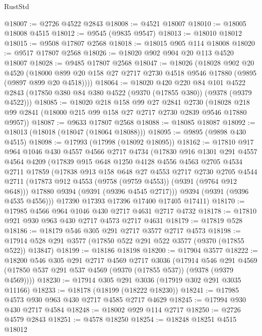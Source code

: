 \begin{lexlean}{RustStd}
\begin{coremodule}
@18007 := @2726 @4522 @2843
@18008 := @4521 @18007
@18010 := @18005 @18008 @4515
@18012 := @9545 (@9835 @9547)
@18013 := @18010 @18012
@18015 := @9508 @17807 @2568
@18018 := @18015 @905 @114 @18008
@18020 := @9517 @17807 @2568
@18026 := @18020 @902 @904 @20 @113 @4520 @18007
@18028 := @9485 @17807 @2568
@18047 := @18026
    (@18028
      @902
      @20
      @4520
      (@18000 @899 @20 @158 @27 @2717 @2730 @4518 @9546 @17880 (@9895 (@9897 @899 @20 @4518))))
@18064 := @18020
    @420
    @220
    @84
    @101
    @4522
    @2843
    (@17850 @380 @84 @380 @4522 (@9370 (@17855 @380)) (@9378 (@9379 @4522)))
@18085 := @18020
    @218
    @158
    @99
    @27
    @2841
    @2730
    (@18028 @218 @99 @2841 (@18000 @215 @99 @158 @27 @2717 @2730 @2839 @9546 @17880 @9957))
@18087 := @9633 @17807 @2568
@18088 := @18085 @18087
@18092 := @18013 (@18018 (@18047 (@18064 @18088)))
@18095 := @9895 (@9898 @430 @4515)
@18098 := @17993 (@17998 (@18092 @18095))
@18162 := @17810
    @917
    @964
    @1046
    @430
    @4557
    @4566
    @2717
    @4734
    (@17830
      @916
      @1301
      @291
      @4557
      @4564
      @4209
      (@17839
        @915
        @648
        @1250
        @4128
        @4556
        @4563
        @2705
        @4534
        @2711
        @17859
        (@17838
          @913
          @158
          @648
          @27
          @4553
          @2717
          @2730
          @2705
          @4544
          @2711
          (@17873 @912 @4553 (@9758 (@9759 @4553)) (@9391 (@9764 @912 @648)))
          @17880
          @9394
          (@9391 (@9396 @4545 @2717)))
        @9394
        (@9391 (@9396 @4535 @4556)))
      @17390
      @17393
      @17396
      @17400
      @17405
      @17411)
@18170 := @17985 @4566 @964 @1046 @430 @2717 @4631 @2717 @4732
@18178 := @17810 @921 @930 @963 @430 @2717 @4573 @2717 @4631
@18179 := @17819 @528
@18186 := @18179 @546 @305 @291 @2717 @3577 @2717 @4573
@18198 := @17914 @528 @291 @3577 (@17850 @522 @291 @522 @3577 (@9370 (@17855 @522)) @13847)
@18199 := @18186 @18198
@18200 := @17904 @3577
@18222 := @18200
    @546
    @305
    @291
    @2717
    @4569
    @2717
    @3036
    (@17914
      @546
      @291
      @4569
      (@17850 @537 @291 @537 @4569 (@9370 (@17855 @537)) (@9378 (@9379 @4569))))
@18230 := @17914 @305 @291 @3036 (@17919 @302 @291 @3035 @11166)
@18233 := @18178 (@18199 (@18222 @18230))
@18241 := @17985 @4573 @930 @963 @430 @2717 @4585 @2717 @4629
@18245 := @17994 @930 @430 @2717 @4584
@18248 := @18002 @929 @114 @2717
@18250 := @2726 @4579 @2843
@18251 := @4578 @18250
@18254 := @18248 @18251 @4515 @18012

\end{coremodule}
\end{lexlean}
